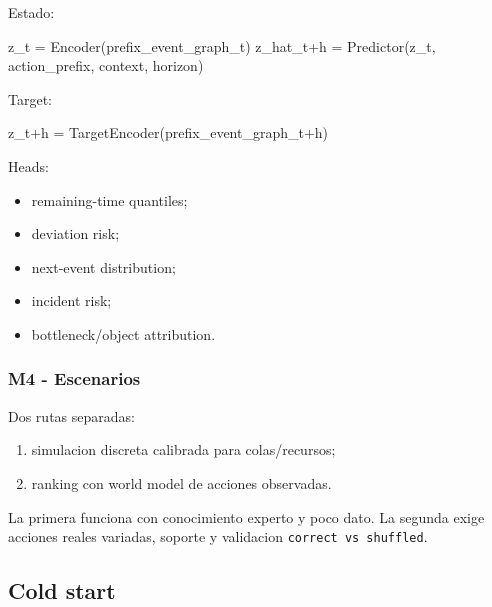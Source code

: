 \documentclass[
  spanish,
  10pt,
  a4paper,
]{article}
\newenvironment{Shaded}{}{}
\newcommand{\NormalTok}[1]{#1}
\providecommand{\tightlist}{%
  \setlength{\itemsep}{0pt}\setlength{\parskip}{0pt}}
\begin{document}
Estado:

\begin{Shaded}
\begin{Highlighting}[]
\NormalTok{z\_t = Encoder(prefix\_event\_graph\_t)}
\NormalTok{z\_hat\_t+h = Predictor(z\_t, action\_prefix, context, horizon)}
\end{Highlighting}
\end{Shaded}

Target:

\begin{Shaded}
\begin{Highlighting}[]
\NormalTok{z\_t+h = TargetEncoder(prefix\_event\_graph\_t+h)}
\end{Highlighting}
\end{Shaded}

Heads:

\begin{itemize}
\tightlist
\item
  remaining-time quantiles;
\item
  deviation risk;
\item
  next-event distribution;
\item
  incident risk;
\item
  bottleneck/object attribution.
\end{itemize}

\subsubsection{M4 - Escenarios}\label{m4---escenarios}

Dos rutas separadas:

\begin{enumerate}
\def\labelenumi{\arabic{enumi}.}
\tightlist
\item
  simulacion discreta calibrada para colas/recursos;
\item
  ranking con world model de acciones observadas.
\end{enumerate}

La primera funciona con conocimiento experto y poco dato. La segunda
exige acciones reales variadas, soporte y validacion
\texttt{correct\ vs\ shuffled}.

\subsection{Cold start}\label{cold-start}
\end{document}

